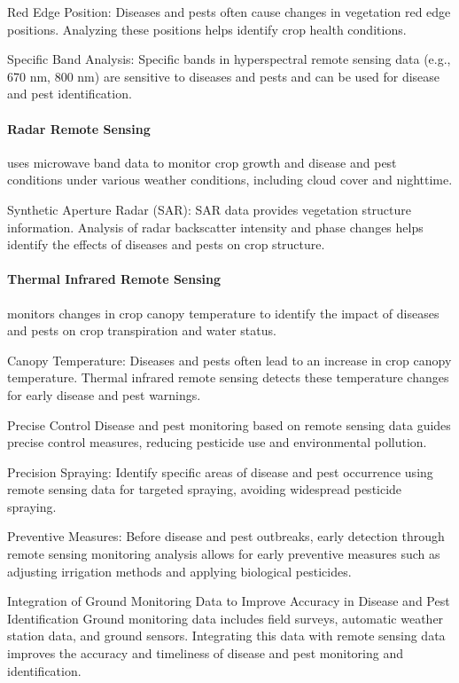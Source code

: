 Red Edge Position: Diseases and pests often cause changes in vegetation red edge positions. Analyzing these positions helps identify crop health conditions.

Specific Band Analysis: Specific bands in hyperspectral remote sensing data (e.g., 670 nm, 800 nm) are sensitive to diseases and pests and can be used for disease and pest identification.

\paragraph*{Radar Remote Sensing} uses microwave band data to monitor crop growth and disease and pest conditions under various weather conditions, including cloud cover and nighttime\cite{javedPerformanceRelationshipFour2021}.

Synthetic Aperture Radar (SAR): SAR data provides vegetation structure information. Analysis of radar backscatter intensity and phase changes helps identify the effects of diseases and pests on crop structure.

\paragraph*{Thermal Infrared Remote Sensing} monitors changes in crop canopy temperature to identify the impact of diseases and pests on crop transpiration and water status.

Canopy Temperature: Diseases and pests often lead to an increase in crop canopy temperature. Thermal infrared remote sensing detects these temperature changes for early disease and pest warnings\cite{navalgundRemoteSensingApplications2007}.

Precise Control
Disease and pest monitoring based on remote sensing data guides precise control measures, reducing pesticide use and environmental pollution.

Precision Spraying: Identify specific areas of disease and pest occurrence using remote sensing data for targeted spraying, avoiding widespread pesticide spraying.

Preventive Measures: Before disease and pest outbreaks, early detection through remote sensing monitoring analysis allows for early preventive measures such as adjusting irrigation methods and applying biological pesticides.

Integration of Ground Monitoring Data to Improve Accuracy in Disease and Pest Identification
Ground monitoring data includes field surveys, automatic weather station data, and ground sensors. Integrating this data with remote sensing data improves the accuracy and timeliness of disease and pest monitoring and identification.

